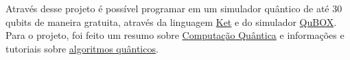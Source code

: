 Através desse projeto é possível programar em um simulador quântico de até 30 qubits de maneira gratuita, através da linguagem \href{https://quantumket.org/}{Ket} e do simulador \href{https://qubox.ufsc.br/qubox.html}{QuBOX}.
Para o projeto, foi feito um resumo sobre \href{https://qubox.ufsc.br/qc.html}{Computação Quântica} e informações e tutoriais sobre \href{https://qubox.ufsc.br/algoritmos/index.html}{algoritmos quânticos}.
